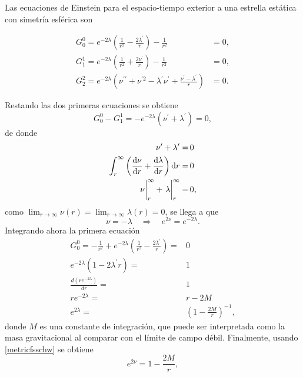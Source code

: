 \normalsize
Las ecuaciones de Einstein para el espacio-tiempo exterior a una estrella estática con simetría esférica son

\begin{align}
     G _ { 0 } ^ { 0 } = e ^ { - 2 \lambda } \left( \frac { 1 } { r ^ { 2 } } - \frac { 2 \lambda ^ { \prime } } { r } \right) - \frac { 1 } { r ^ { 2 } } &= 0, \\
      G _ { 1 } ^ { 1 } = e ^ { - 2 \lambda } \left( \frac { 1 } { r ^ { 2 } } + \frac { 2 \nu ^ { \prime } } { r } \right) - \frac { 1 } { r ^ { 2 } } &= 0, \\
      G _ { 2 } ^ { 2 } = e ^ { - 2 \lambda } \left( \nu ^ { \prime \prime } + \nu ^ { \prime 2 } - \lambda ^ { \prime } \nu ^ { \prime } + \frac { \nu ^ { \prime } - \lambda ^ { \prime } } { r } \right) &=0.
\end{align}

Restando las dos primeras ecuaciones se obtiene
\begin{equation*}
    G _ { 0 } ^ { 0} - G _ { 1 } ^ { 1} = -e^{-2\lambda} (\nu^{\prime}+\lambda^{\prime}) = 0, 
\end{equation*}
de donde
\begin{align*}
    \nu^{\prime}+\lambda^{\prime} =& \,0 \\
    \int_{r}^{\infty} \qty(\dv{\nu}{r}+\dv{\lambda}{r})\dd{r} =& \,0 \\
    \eval{\nu}_{r}^{\infty} + \eval{\lambda}_{r}^{\infty} =& \, 0,
\end{align*}
como $\lim_{r\to \infty}\nu(r)=\lim_{r\to \infty}\lambda(r)=0$, se llega a que
\begin{equation}
    \nu=-\lambda \quad \Longrightarrow \quad e^{2\nu}=e^{-2\lambda}. \label{metricfsschw}
\end{equation}
Integrando ahora la primera ecuación
\begin{align}
    G _ { 0 } ^ { 0} = -\frac{1}{r^{2}}+e^{-2\lambda}\left(\frac{1}{r^{2}}-\frac{2 \lambda^{\prime}}{r}\right) =& 0 \nonumber \\
    e^{-2\lambda}\left(1-2 \lambda^{\prime} r \right) =& 1 \nonumber \\
    \frac{d\left(r e^{-2 \lambda}\right)}{d r} =& 1 \nonumber \\ 
    r e^{-2 \lambda} =& r - 2 M  \nonumber \\
    e^{2 \lambda} =& \left(1-\frac{2 M}{r}\right)^{-1},
\end{align}
donde $M$ es una constante de integración, que puede ser interpretada como la masa gravitacional al comparar con el límite de campo débil. Finalmente, usando \eqref{metricfsschw} se obtiene
\begin{equation}
    e^{2\nu}=1-\frac{2 M}{r},
\end{equation}




